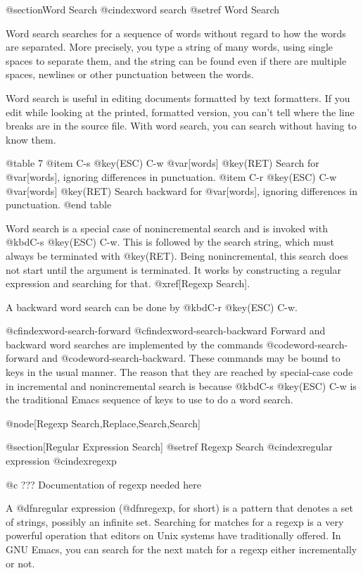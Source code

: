 {{{{{{@section{Word Search}
@cindex{word search}
@setref Word Search

  Word search searches for a sequence of words without regard to how the
words are separated.  More precisely, you type a string of many words,
using single spaces to separate them, and the string can be found even if
there are multiple spaces, newlines or other punctuation between the words.

  Word search is useful in editing documents formatted by text formatters.
If you edit while looking at the printed, formatted version, you can't tell
where the line breaks are in the source file.  With word search, you can
search without having to know them.

@table 7
@item C-s @key(ESC) C-w @var[words] @key(RET)
Search for @var[words], ignoring differences in punctuation.
@item C-r @key(ESC) C-w @var[words] @key(RET)
Search backward for @var[words], ignoring differences in punctuation.
@end table

  Word search is a special case of nonincremental search and is invoked
with @kbd{C-s @key(ESC) C-w}.  This is followed by the search string,
which must always be terminated with @key(RET).  Being nonincremental,
this search does not start until the argument is terminated.  It works
by constructing a regular expression and searching for that.
@xref[Regexp Search].

  A backward word search can be done by @kbd{C-r @key(ESC) C-w}.

@cfindex{word-search-forward}
@cfindex{word-search-backward}
  Forward and backward word searches are implemented by the commands
@code{word-search-forward} and @code{word-search-backward}.  These commands
may be bound to keys in the usual manner.  The reason that they are reached
by special-case code in incremental and nonincremental search is because
@kbd{C-s @key(ESC) C-w} is the traditional Emacs sequence of keys to use
to do a word search.

@node[Regexp Search,Replace,Search,Search]

@section[Regular Expression Search]
@setref Regexp Search
@cindex{regular expression}
@cindex{regexp}

@c ??? Documentation of regexp needed here

  A @dfn{regular expression} (@dfn{regexp}, for short) is a pattern that
denotes a set of strings, possibly an infinite set.  Searching for matches
for a regexp is a very powerful operation that editors on Unix systems have
traditionally offered.  In GNU Emacs, you can search for the next match for
a regexp either incrementally or not.

}}}}}}
